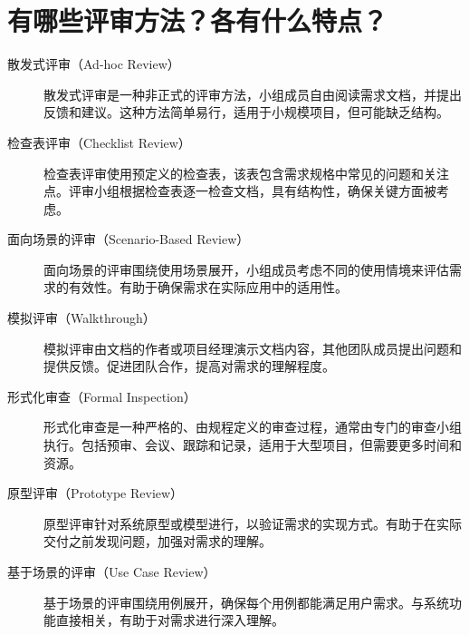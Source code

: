 \documentclass[11pt, a4paper, oneside]{ctexbook}
\begin{document}
\chapter{有哪些评审方法？各有什么特点？}
\begin{description}
    \item[散发式评审（Ad-hoc Review）] 散发式评审是一种非正式的评审方法，小组成员自由阅读需求文档，并提出反馈和建议。这种方法简单易行，适用于小规模项目，但可能缺乏结构。
    \item[检查表评审（Checklist Review）] 检查表评审使用预定义的检查表，该表包含需求规格中常见的问题和关注点。评审小组根据检查表逐一检查文档，具有结构性，确保关键方面被考虑。
    \item[面向场景的评审（Scenario-Based Review）] 面向场景的评审围绕使用场景展开，小组成员考虑不同的使用情境来评估需求的有效性。有助于确保需求在实际应用中的适用性。
    \item[模拟评审（Walkthrough）] 模拟评审由文档的作者或项目经理演示文档内容，其他团队成员提出问题和提供反馈。促进团队合作，提高对需求的理解程度。
    \item[形式化审查（Formal Inspection）] 形式化审查是一种严格的、由规程定义的审查过程，通常由专门的审查小组执行。包括预审、会议、跟踪和记录，适用于大型项目，但需要更多时间和资源。
    \item[原型评审（Prototype Review）] 原型评审针对系统原型或模型进行，以验证需求的实现方式。有助于在实际交付之前发现问题，加强对需求的理解。
    \item[基于场景的评审（Use Case Review）] 基于场景的评审围绕用例展开，确保每个用例都能满足用户需求。与系统功能直接相关，有助于对需求进行深入理解。
\end{description}
\end{document}

